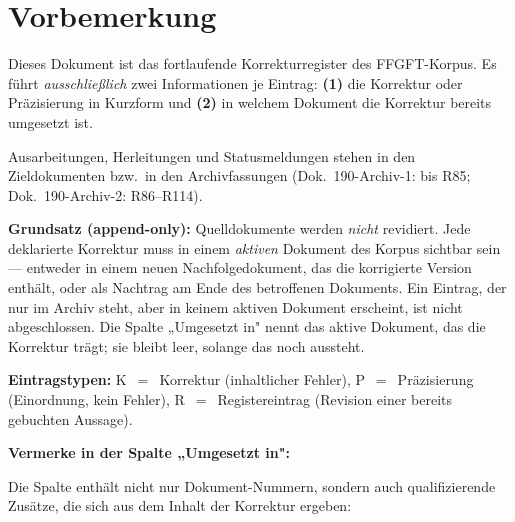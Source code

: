 %

\providecommand{\QM}{\textbf{[Q]}}

\section*{Vorbemerkung}

Dieses Dokument ist das fortlaufende Korrekturregister des FFGFT-Korpus.
Es führt \emph{ausschließlich} zwei Informationen je Eintrag:
\textbf{(1)} die Korrektur oder Präzisierung in Kurzform und
\textbf{(2)} in welchem Dokument die Korrektur bereits umgesetzt ist.

Ausarbeitungen, Herleitungen und Statusmeldungen stehen in den Zieldokumenten
bzw.\ in den Archivfassungen (Dok.~190-Archiv-1: bis R85; Dok.~190-Archiv-2: R86–R114).

\textbf{Grundsatz (append-only):} Quelldokumente werden \emph{nicht} revidiert.
Jede deklarierte Korrektur muss in einem \emph{aktiven} Dokument des Korpus
sichtbar sein --- entweder in einem neuen Nachfolgedokument, das die korrigierte
Version enthält, oder als Nachtrag am Ende des betroffenen Dokuments.
Ein Eintrag, der nur im Archiv steht, aber in keinem aktiven Dokument
erscheint, ist nicht abgeschlossen. Die Spalte „Umgesetzt in" nennt das aktive
Dokument, das die Korrektur trägt; sie bleibt leer, solange das noch aussteht.

\textbf{Eintragstypen:}
K~$=$~Korrektur (inhaltlicher Fehler),
P~$=$~Präzisierung (Einordnung, kein Fehler),
R~$=$~Registereintrag (Revision einer bereits gebuchten Aussage).

\textbf{Vermerke in der Spalte „Umgesetzt in":}

Die Spalte enthält nicht nur Dokument-Nummern, sondern auch qualifizierende
Zusätze, die sich aus dem Inhalt der Korrektur ergeben:

